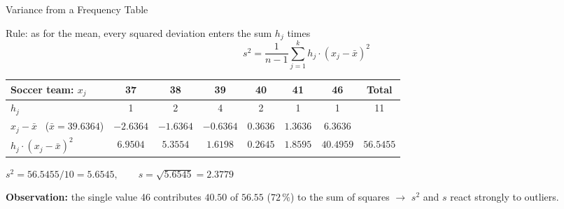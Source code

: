 \documentclass[aspectratio=169,11pt]{beamer}
\begin{document}
\begin{frame}{Variance from a Frequency Table}
  \begin{block}{Rule: as for the mean, every squared deviation enters the sum $h_j$ times}
    \[ s^2 = \frac{1}{n-1}\sum_{j=1}^{k} h_j \cdot (x_j - \bar{x})^2 \]
  \end{block}
  \begin{center}
    \small\renewcommand{\arraystretch}{1.1}
    \begin{tabular}{lccccccc}
      \toprule
      Soccer team: $x_j$ & 37 & 38 & 39 & 40 & 41 & 46 & Total \\
      \midrule
      $h_j$ & 1 & 2 & 4 & 2 & 1 & 1 & 11 \\
      $x_j - \bar{x}$ \ ($\bar{x} = 39.6364$) & $-2.6364$ & $-1.6364$ & $-0.6364$ & $0.3636$ & $1.3636$ & $6.3636$ & \\
      $h_j \cdot (x_j - \bar{x})^2$ & $6.9504$ & $5.3554$ & $1.6198$ & $0.2645$ & $1.8595$ & $40.4959$ & $56.5455$ \\
      \bottomrule
    \end{tabular}
  \end{center}
  \centerline{$s^2 = 56.5455 / 10 = \mathbf{5.6545}, \qquad s = \sqrt{5.6545} = \mathbf{2.3779}$}
  \vspace{0.15cm}
  \textcolor{hsbirot}{\textbf{Observation:}} the single value 46 contributes $40.50$ of $56.55$
  ($72\,\%$) to the sum of squares $\to$ $s^2$ and $s$ react strongly to outliers.
\end{frame}
\end{document}
